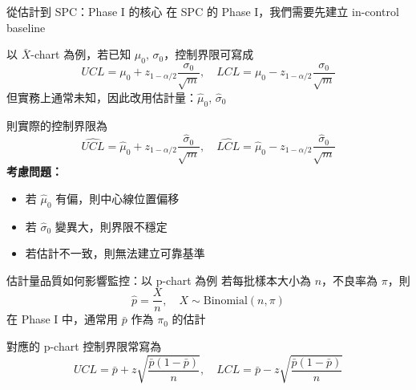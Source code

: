 \documentclass[aspectratio=169,12pt]{beamer}
\begin{document}
\begin{frame}{從估計到 SPC：Phase I 的核心}
    在 SPC 的 Phase I，我們需要先建立 in-control baseline

    \vspace{0.5em}
    以 $\bar X$-chart 為例，若已知 $\mu_0,\, \sigma_0$，控制界限可寫成
    $$
    UCL=\mu_0+z_{1-\alpha/2}\frac{\sigma_0}{\sqrt{m}},
    \quad
    LCL=\mu_0-z_{1-\alpha/2}\frac{\sigma_0}{\sqrt{m}}
    $$
    但實務上通常未知，因此改用估計量：$\hat{\mu}_0,\, \hat{\sigma}_0$

    \vspace{0.5em}
    則實際的控制界限為
    $$
    \widehat{UCL}=\hat{\mu}_0+z_{1-\alpha/2}\frac{\hat{\sigma}_0}{\sqrt{m}},
    \quad
    \widehat{LCL}=\hat{\mu}_0-z_{1-\alpha/2}\frac{\hat{\sigma}_0}{\sqrt{m}}
    $$
    \textbf{考慮問題：}
    \begin{itemize}
        \item 若 $\hat{\mu}_0$ 有偏，則中心線位置偏移
        \item 若 $\hat{\sigma}_0$ 變異大，則界限不穩定
        \item 若估計不一致，則無法建立可靠基準
    \end{itemize}
\end{frame}

\begin{frame}{估計量品質如何影響監控：以 p-chart 為例}
    若每批樣本大小為 $n$，不良率為 $\pi$，則 $$\hat p=\frac{X}{n}, \quad X\sim\mathrm{Binomial}(n, \pi)$$
    在 Phase I 中，通常用 $\bar p$ 作為 $\pi_0$ 的估計

    對應的 p-chart 控制界限常寫為
    $$
    UCL=\bar p + z\sqrt{\frac{\bar p(1-\bar p)}{n}},
    \quad
    LCL=\bar p - z\sqrt{\frac{\bar p(1-\bar p)}{n}}
    $$

\end{frame}
\end{document}
